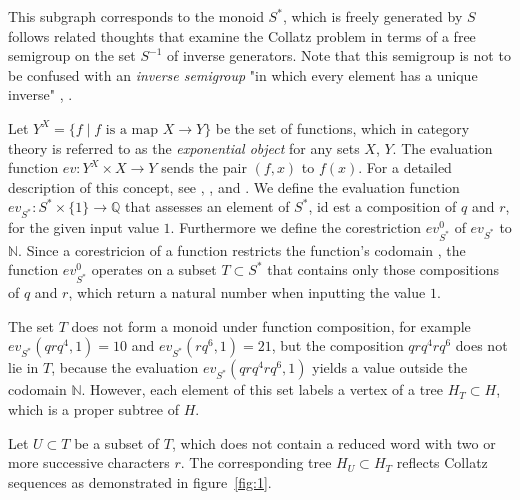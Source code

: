 This subgraph corresponds to the monoid $S^\ast$, which is freely generated by $S$ follows related thoughts \cite{Ref_Truemper_2014} that examine the Collatz problem in terms of a free semigroup on the set $S^{-1}$ of inverse generators. Note that this semigroup is not to be confused with an \textit{inverse semigroup} "in which every element has a unique inverse" \cite[p.~26]{Ref_Almeida}, \cite[p.~22]{Ref_Loeh}.

Let $Y^X=\{f\mid f\text{ is a map }X\rightarrow Y\}$ be the set of functions, which in category theory is referred to as the \textit{exponential object} for any sets $X$, $Y$. The evaluation function $ev:Y^X\times X\to Y$ sends the pair $(f,x)$ to $f(x)$. For a detailed description of this concept, see \cite[p.~127]{Ref_Johnsonbaugh}, \cite[p.~155]{Ref_MacLane_Birkhoff}, \cite[p.~54]{Ref_Novak_etal} and \cite[p.~188]{Ref_Pellissier}. We define the evaluation function $ev_{S^\ast}:S^\ast\times\{1\}\rightarrow\mathbb{Q}$ that assesses an element of $S^\ast$, id est a composition of $q$ and $r$, for the given input value $1$. Furthermore we define the corestriction ${ev^0_{S^\ast}}$ of $ev_{S^\ast}$ to $\mathbb{N}$. Since a corestricion of a function restricts the function's codomain \cite[p.~3]{Ref_Helemskii}, the function $ev^0_{S^\ast}$ operates on a subset $T\subset S^\ast$ that contains only those compositions of $q$ and $r$, which return a natural number when inputting the value $1$.

The set $T$ does not form a monoid under function composition, for example $ev_{S^\ast}(qrq^4,1)=10$ and $ev_{S^\ast}(rq^6,1)=21$, but the composition $qrq^4rq^6$ does not lie in $T$, because the evaluation $ev_{S^\ast}(qrq^4rq^6,1)$ yields a value outside the codomain $\mathbb{N}$. However, each element of this set labels a vertex of a tree $H_{T}\subset H$, which is a proper subtree of $H$.

Let $U\subset T$ be a subset of $T$, which does not contain a reduced word with two or more successive characters $r$. The corresponding tree $H_{U}\subset H_{T}$ reflects Collatz sequences as demonstrated in figure~\ref{fig:1}.

